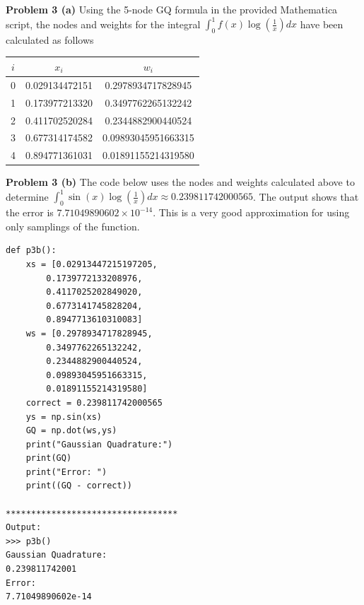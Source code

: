 \documentclass[12pt]{article}
\newcommand{\problem}[1]{\hspace{-4 ex} \large \textbf{Problem #1} }
\begin{document}
	
\bigbreak
\problem{3 (a)} Using the 5-node GQ formula in the provided Mathematica script, the nodes and weights for the integral $\int_0^1 f(x)\log(\tfrac{1}{x})dx$ have been calculated as follows\\
\begin{center}
	\begin{tabular}{|c|c|c|}\hline
		$i$ & $x_i$ & $w_i$\\ \hline
		0 & 0.029134472151 & 0.2978934717828945 \\ \hline
		1 & 0.173977213320 & 0.3497762265132242 \\ \hline
		2 & 0.411702520284 & 0.2344882900440524 \\ \hline
		3 & 0.677314174582 & 0.09893045951663315 \\ \hline
		4 & 0.894771361031 & 0.01891155214319580 \\ \hline
	\end{tabular}
\end{center}

\bigbreak
\problem{3 (b)} The code below uses the nodes and weights calculated above to determine $\int_0^1 \sin(x)\log(\tfrac{1}{x})dx \approx 0.239811742000565$. The output shows that the error is $7.71049890602\times 10^{-14}$. This is a very good approximation for using only samplings of the function.

\begin{lstlisting}
def p3b():
	xs = [0.02913447215197205,
		0.1739772133208976,
		0.4117025202849020,
		0.6773141745828204,
		0.8947713610310083]
	ws = [0.2978934717828945,
		0.3497762265132242,
		0.2344882900440524,
		0.09893045951663315,
		0.01891155214319580]
	correct = 0.239811742000565
	ys = np.sin(xs)
	GQ = np.dot(ws,ys)
	print("Gaussian Quadrature:")
	print(GQ)
	print("Error: ")
	print((GQ - correct))

**********************************
Output:
>>> p3b()
Gaussian Quadrature:
0.239811742001
Error: 
7.71049890602e-14
\end{lstlisting}
\end{document}
